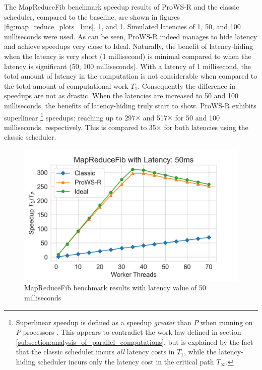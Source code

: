 \documentclass[bsc,frontabs,singlespacing,parskip,deptreport,normalheadings]{infthesis}
\begin{document}
The MapReduceFib benchmark speedup results of ProWS-R and the classic scheduler,
compared to the baseline, are shown in figures \ref{fig:map_reduce_plots_1ms},
\ref{fig:map_reduce_plots_50ms}, and \ref{fig:map_reduce_plots_50ms}. Simulated
latencies of 1, 50, and 100 milliseconds were used. As can be seen, ProWS-R
indeed manages to hide latency and achieve speedups very close to Ideal.
Naturally, the benefit of latency-hiding when the latency is very short (1
millisecond) is minimal compared to when the latency is significant (50, 100
milliseconds). With a latency of 1 millisecond, the total amount of latency in
the computation is not considerable when compared to the total amount of
computational work \(T_1\). Consequently the difference in speedups are not as
drastic. When the latencies are increased to 50 and 100 milliseconds, the
benefits of latency-hiding truly start to show. ProWS-R exhibits superlinear
\footnote{Superlinear speedup is defined as a speedup \textit{greater} than
    \(P\) when running on \(P\) processors \cite{ristov_superlinear_2016}. This
    appears to contradict the work law defined in section
    \ref{subsection:analysis_of_parallel_computations}, but is explained by the
    fact that the classic scheduler incurs \textit{all} latency costs in
    \(T_1\), while the latency-hiding scheduler incurs only the latency cost in
    the critical path \(T_\infty\).} speedups: reaching up to 297\(\times\) and
    517\(\times\) for 50 and 100 milliseconds, respectively. This is compared to
    35\(\times\) for both latencies using the classic scheduler.

\begin{figure}[ht]
    \centering
    \includegraphics[width=0.8\linewidth]{figures/map_reduce_plot_latency_50.png}
    \caption{MapReduceFib benchmark results with latency value of 50 milliseconds}
    \label{fig:map_reduce_plots_50ms}
\end{figure}
\end{document}
